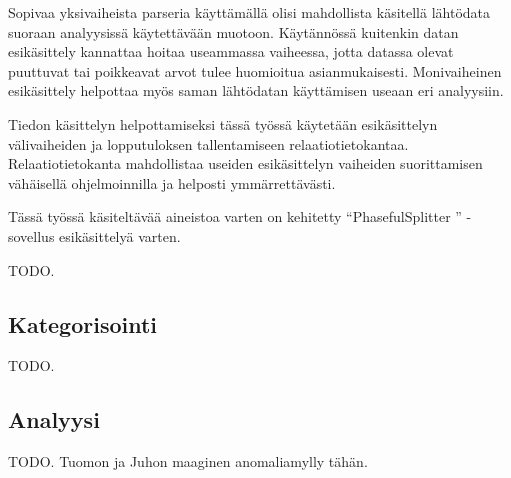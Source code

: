 Sopivaa yksivaiheista parseria käyttämällä olisi mahdollista käsitellä
lähtödata suoraan analyysissä käytettävään muotoon. Käytännössä kuitenkin datan
esikäsittely kannattaa hoitaa useammassa vaiheessa, jotta datassa
olevat puuttuvat tai poikkeavat arvot tulee huomioitua
asianmukaisesti. Monivaiheinen esikäsittely helpottaa myös saman
lähtödatan käyttämisen useaan eri analyysiin.

Tiedon käsittelyn helpottamiseksi tässä työssä käytetään esikäsittelyn
välivaiheiden ja lopputuloksen tallentamiseen
relaatiotietokantaa. Relaatiotietokanta mahdollistaa useiden
esikäsittelyn vaiheiden suorittamisen vähäisellä ohjelmoinnilla ja
helposti ymmärrettävästi.

Tässä työssä käsiteltävää aineistoa varten on kehitetty ``PhasefulSplitter
'' -sovellus esikäsittelyä varten.

TODO.

\subsection{Kategorisointi}

TODO.

\subsection{Analyysi}

TODO. Tuomon ja Juhon maaginen anomaliamylly tähän.
